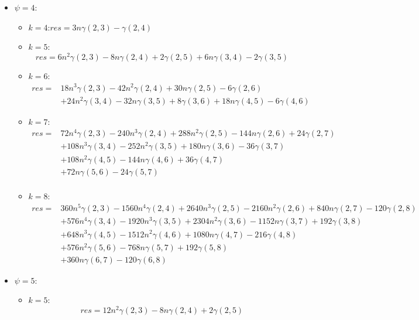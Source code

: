 \documentclass{article}
\begin{document}
\begin{itemize}
    \item $\psi = 4$:
    \begin{itemize}[label=$\circ$]
    	\item $k=4$:$res = 3n\gamma(2,3) - \gamma(2,4)$
        \item $k=5$:
        \[
        res = 6n^2\gamma(2,3) -8n\gamma(2,4) + 2\gamma(2,5) + 6n\gamma(3,4) - 2\gamma(3,5)
        \]
        
        \item $k=6$:
        \[
        \begin{aligned}
        res = &18n^3\gamma(2,3) - 42n^2\gamma(2,4) + 30n\gamma(2,5) - 6\gamma(2,6)\\
        & + 24n^2\gamma(3,4) - 32n\gamma(3,5) + 8\gamma(3,6)+ 18n\gamma(4,5) - 6\gamma(4,6)
        \end{aligned}
        \]
        
        \item $k=7$:
        \[
        \begin{aligned}
        res = &72n^4\gamma(2,3) - 240n^3\gamma(2,4) + 288n^2\gamma(2,5) - 144n\gamma(2,6) + 24\gamma(2,7)\\
        &+ 108n^3\gamma(3,4) - 252n^2\gamma(3,5) + 180n\gamma(3,6) - 36\gamma(3,7)\\
        &+ 108n^2\gamma(4,5) -144n\gamma(4,6) + 36\gamma(4,7)\\
        &+ 72n\gamma(5,6) -24\gamma(5,7)\\
        \end{aligned}
        \]
        
        \item $k=8$:
        \[
        \begin{aligned}
        res = &360n^5\gamma(2,3) - 1560n^4\gamma(2,4) + 2640n^3\gamma(2,5) - 2160n^2\gamma(2,6) + 840n\gamma(2,7) - 120\gamma(2,8)\\
        &+ 576n^4\gamma(3,4) - 1920n^3\gamma(3,5) + 2304n^2\gamma(3,6) - 1152n\gamma(3,7) + 192\gamma(3,8)\\
        &+ 648n^3\gamma(4,5) - 1512n^2\gamma(4,6) + 1080n\gamma(4,7) - 216\gamma(4,8)\\
        &+ 576n^2\gamma(5,6) - 768n\gamma(5,7) + 192\gamma(5,8)\\
        &+ 360n\gamma(6,7) - 120\gamma(6,8)
        \end{aligned}
        \]
    \end{itemize}
    
    \item $\psi = 5$:
    \begin{itemize}[label=$\circ$]
    	\item $k=5$:
	\[
	res = 12n^2\gamma(2,3) - 8n\gamma(2,4) + 2\gamma(2,5)
	\]
	

\end{itemize}
\end{itemize}
\end{document}
